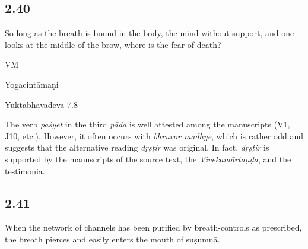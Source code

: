 \begin{ekdosis}
\subsection*{2.40}
\begin{translation}[hp02_040]
So long as the breath is bound in the body, the mind without support, and one looks at the middle of the brow, where is the fear of death?
\end{translation}

\begin{sources}[hp02_040]
VM

\begin{versinnote}
\end{versinnote}
\end{sources}

\begin{testimonia}[hp02_040]
Yogacintāmaṇi

\begin{versinnote}
\end{versinnote}
Yuktabhavadeva 7.8

\begin{versinnote}
\end{versinnote}
\end{testimonia}

\begin{philcomm}[hp02_040]
The verb \emph{paśyet} in the third \emph{pāda} is well attested among the manuscripts (V1, J10, etc.). However, it often occurs with \emph{bhruvor madhye}, which is rather odd and suggests that the alternative reading \emph{dṛṣṭir} was original. In fact, \emph{dṛṣṭir} is supported by the manuscripts of the source text, the \emph{Vivekamārtaṇḍa}, and the testimonia. 
\end{philcomm}

\subsection*{2.41}
\begin{translation}[hp02_041]
When the network of channels has been purified by breath-controls as prescribed, the breath pierces and easily enters the mouth of suṣumṇā.
\end{translation}


\end{ekdosis}
